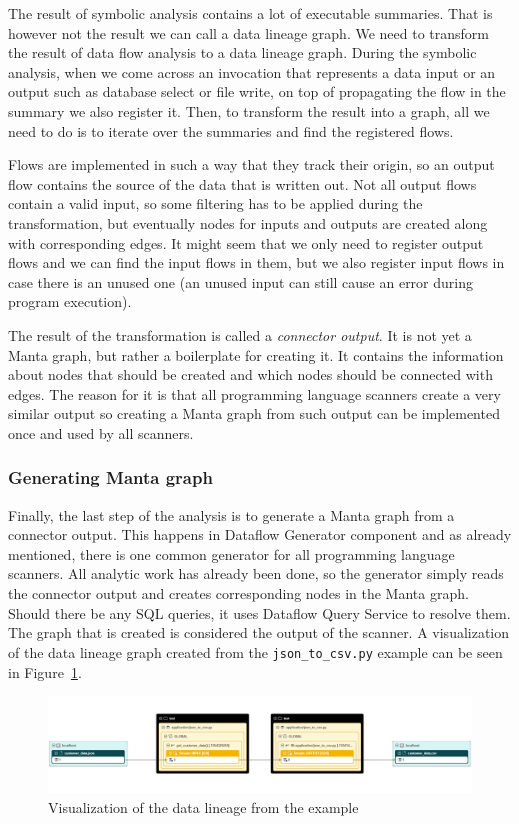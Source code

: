 The result of symbolic analysis contains a lot of executable summaries. That is however not the result we can call a data lineage graph. We need to transform the result of data flow analysis to a data lineage graph. During the symbolic analysis, when we come across an invocation that represents a data input or an output such as database select or file write, on top of propagating the flow in the summary we also register it. Then, to transform the result into a graph, all we need to do is to iterate over the summaries and find the registered flows.
\par
Flows are implemented in such a way that they track their origin, so an output flow contains the source of the data that is written out. Not all output flows contain a valid input, so some filtering has to be applied during the transformation, but eventually nodes for inputs and outputs are created along with corresponding edges. It might seem that we only need to register output flows and we can find the input flows in them, but we also register input flows in case there is an unused one (an unused input can still cause an error during program execution).
\par
The result of the transformation is called a \textit{connector output}. It is not yet a Manta graph, but rather a boilerplate for creating it. It contains the information about nodes that should be created and which nodes should be connected with edges. The reason for it is that all programming language scanners create a very similar output so creating a Manta graph from such output can be implemented once and used by all scanners.

\subsubsection{Generating Manta graph}

Finally, the last step of the analysis is to generate a Manta graph from a connector output. This happens in Dataflow Generator component and as already mentioned, there is one common generator for all programming language scanners. All analytic work has already been done, so the generator simply reads the connector output and creates corresponding nodes in the Manta graph. Should there be any SQL queries, it uses Dataflow Query Service to resolve them. The graph that is created is considered the output of the scanner. A visualization of the data lineage graph created from the \texttt{json\_to\_csv.py} example can be seen in Figure~\ref{fig:lineage}.

\begin{figure}[ht]\centering
\includegraphics[width=1.0\textwidth]{img/json_to_csv.PNG}
\caption{Visualization of the data lineage from the example}
\label{fig:lineage}
\end{figure}  